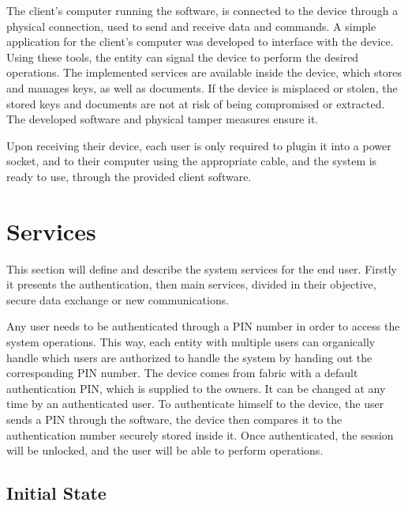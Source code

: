 The client's computer running the software, is connected to the device through a physical connection, used to send and receive data and commands. A simple application for the client's computer was developed to interface with the device.
Using these tools, the entity can signal the device to perform the desired operations.
The implemented services are available inside the device, which stores and manages keys, as well as documents.
If the device is misplaced or stolen, the stored keys and documents are not at risk of being compromised or extracted. The developed software and physical tamper measures ensure it.

Upon receiving their device, each user is only required to plugin it into a power socket, and to their computer using the appropriate cable, and the system is ready to use, through the provided client software.

\section{Services}\label{chap:arch:services}

This section will define and describe the system services for the end user.
Firstly it presents the authentication, then main services, divided in their objective, secure data exchange or new communications.

Any user needs to be authenticated through a \ac{PIN} number in order to access the system operations. This way, each entity with multiple users can organically handle which users are authorized to handle the system by handing out the corresponding \ac{PIN} number.
The device comes from fabric with a default authentication \ac{PIN}, which is supplied to the owners. It can be changed at any time by an authenticated user.
To authenticate himself to the device, the user sends a \ac{PIN} through the software, the device then compares it to the authentication number securely stored inside it. Once authenticated, the session will be unlocked, and the user will be able to perform operations.

\subsection{Initial State}\label{chap:arch:services:initial-state}

